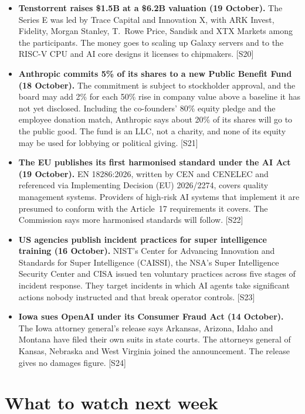\documentclass[11pt,a4paper]{article}
\newcommand{\srcref}[1]{\textcolor{brandaccent}{[S#1]}}
\begin{document}
\begin{itemize}
  \item \textbf{Tenstorrent raises \$1.5B at a \$6.2B valuation (19 October).} The Series E was led by Trace Capital and
  Innovation X, with ARK Invest, Fidelity, Morgan Stanley, T.~Rowe Price, Sandisk and XTX Markets among the participants. The
  money goes to scaling up Galaxy servers and to the RISC-V CPU and AI core designs it licenses to chipmakers. \srcref{20}
  \item \textbf{Anthropic commits 5\% of its shares to a new Public Benefit Fund (18 October).} The commitment is subject to stockholder approval, and the
  board may add 2\% for each 50\% rise in company value above a baseline it has not yet disclosed. Including the co-founders' 80\% equity pledge and
  the employee donation match, Anthropic says about 20\% of its shares will go to the public good. The fund is an LLC, not a charity, and none of its equity may be used for lobbying or
  political giving. \srcref{21}
  \item \textbf{The EU publishes its first harmonised standard under the AI Act (19 October).} EN 18286:2026, written by CEN and CENELEC and referenced
  via Implementing Decision (EU) 2026/2274, covers quality management systems. Providers of high-risk AI systems that implement it are presumed to
  conform with the Article~17 requirements it covers. The Commission says more harmonised standards will follow. \srcref{22}
  \item \textbf{US agencies publish incident practices for super intelligence training (16 October).} NIST's Center for Advancing Innovation and Standards for Super Intelligence (CAISSI),
  the NSA's Super Intelligence Security Center and CISA issued ten voluntary practices across five stages of incident response. They target incidents in which AI agents take
  significant actions nobody instructed and that break operator controls. \srcref{23}
  \item \textbf{Iowa sues OpenAI under its Consumer Fraud Act (14 October).} The Iowa attorney general's release says Arkansas, Arizona, Idaho and
  Montana have filed their own suits in state courts. The attorneys general of Kansas, Nebraska and West Virginia joined the announcement. The
  release gives no damages figure. \srcref{24}
\end{itemize}

\section{What to watch next week}
\end{document}
